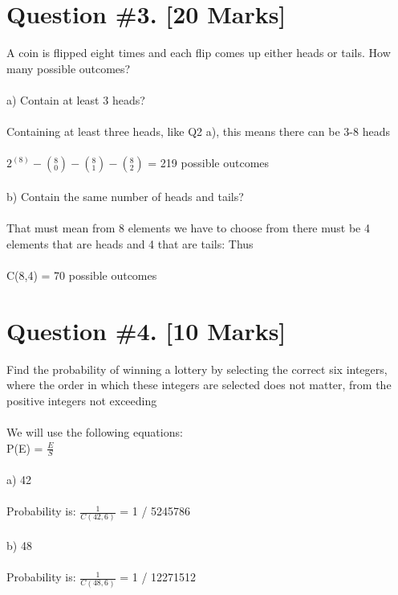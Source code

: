 \documentclass{article}
\begin{document}
\newpage

\section{Question \#3. [20 Marks]}
A coin is flipped eight times and each flip comes up either heads or tails. How many possible outcomes? \\\\
a) Contain at least 3 heads? \\ \\ 
Containing at least three heads, like Q2 a), this means there can be 3-8 heads \\ \\
$2^{(8)} -  (_{0}^{8}) -  (_{1}^{8}) -  (_{2}^{8})$ = 219 possible outcomes \\\\
b) Contain the same number of heads and tails? \\\\
That must mean from 8 elements we have to choose from there must be 4 elements that are heads and 4 that are tails: Thus \\ \\
C(8,4) = 70 possible outcomes
\newpage

\section{Question \#4. [10 Marks]}
Find the probability of winning a lottery by selecting the correct six integers, where the order in which these integers are selected does not matter, from the positive integers not exceeding \\ \\
We will use the following equations: \\
P(E) = $\frac{E}{S}$\\\\
a) 42 \\\\
Probability is: $\frac{1}{C(42,6)}$ = 1 / 5245786  \\\\
b) 48 \\\\ 
Probability is: $\frac{1}{C(48,6)}$ = 1 / 12271512
\newpage
\end{document}
